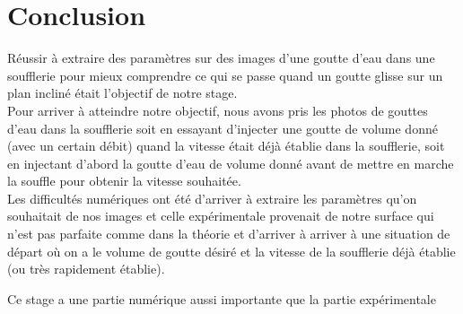 
\section{Conclusion}

Réussir à extraire des paramètres sur des images d'une goutte d'eau dans une soufflerie pour mieux comprendre ce qui se passe quand un goutte glisse sur un plan incliné était l'objectif de notre stage.\\


Pour arriver à atteindre notre objectif, nous avons pris les photos de gouttes d'eau dans la soufflerie soit en essayant d'injecter une goutte de volume donné (avec un certain débit) quand la vitesse était déjà établie dans la soufflerie, soit en injectant d'abord la goutte d'eau de volume donné avant de mettre en marche la souffle pour obtenir la vitesse souhaitée.\\

Les difficultés numériques ont été d'arriver à extraire les paramètres qu'on souhaitait de nos images et celle expérimentale provenait de notre surface qui n'est pas parfaite comme dans la théorie et d'arriver à arriver à une situation de départ où on a le volume de goutte désiré et la vitesse de la soufflerie déjà établie (ou très rapidement établie).

Ce stage a une partie numérique aussi importante que la partie expérimentale

